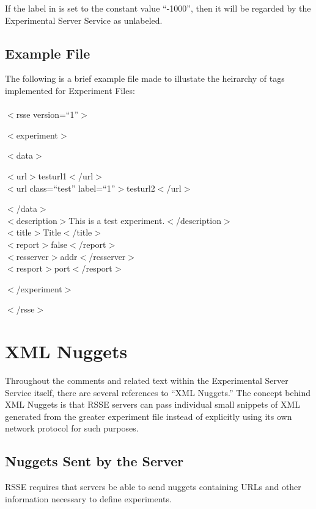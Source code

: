 \documentclass[letterpaper]{article}
\begin{document}
If the label in is set to the constant value ``-1000'', then it will be regarded by the Experimental Server Service as unlabeled. 

\subsection{Example File}
The following is a brief example file made to illustate the heirarchy of tags implemented for Experiment Files:
\\
\\
$<$rsse version=``1''$>$
\begin{addmargin}[1em]{2em}
	 $<$experiment$>$
     \begin{addmargin}[2em]{3em}
          $<$data$>$
          \begin{addmargin}[3em]{4em}
               $<$url$>$testurl1$<$/url$>$\\
               $<$url class=``test'' label=``1''$>$testurl2$<$/url$>$
          \end{addmargin}
          $<$/data$>$\\
          $<$description$>$This is a test experiment.$<$/description$>$\\
          $<$title$>$Title$<$/title$>$\\ 
          $<$report$>$false$<$/report$>$\\
          $<$resserver$>$addr$<$/resserver$>$\\
          $<$resport$>$port$<$/resport$>$
      \end{addmargin}
      $<$/experiment$>$
\end{addmargin}
$<$/rsse$>$\\

\section{XML Nuggets}
Throughout the comments and related text within the Experimental Server Service itself, there are several references to ``XML Nuggets.'' The concept behind XML Nuggets is that RSSE servers can pass individual small snippets of XML generated from the greater experiment file instead of explicitly using its own network protocol for such purposes. 

\subsection{Nuggets Sent by the Server}
RSSE requires that servers be able to send nuggets containing URLs and other information necessary to define experiments.  
\end{document}
